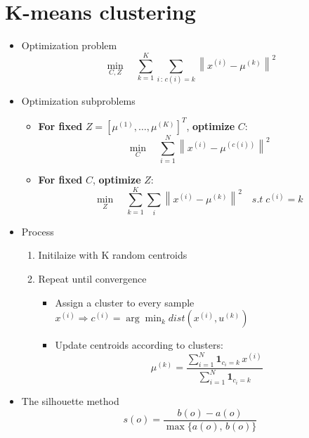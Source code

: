 \documentclass[11pt]{article}
\begin{document}
\section{K-means clustering}
\begin{itemize}
	\item Optimization problem
	      \[
		      \min_{C, Z} \quad \sum_{k=1}^{K} \sum_{i \,:\, c(i)=k} \left\| x^{(i)} - \mu^{(k)} \right\|^2
	      \]
	\item Optimization subproblems
	      \begin{itemize}
		      \item \textbf{For fixed } $Z = [\mu^{(1)}, \dots, \mu^{(K)}]^T$, \textbf{optimize } $C$:
		            \[
			            \min_{C} \quad \sum_{i=1}^{N} \left\| x^{(i)} - \mu^{(c(i))} \right\|^2
		            \]

		      \item \textbf{For fixed } $C$, \textbf{optimize } $Z$:
		            \[
			            \min_{Z} \quad \sum_{k=1}^{K} \sum_{i} \left\| x^{(i)} - \mu^{(k)} \right\|^2\quad s.t \; c^{(i)} = k
		            \]

	      \end{itemize}

	\item Process
	      \begin{enumerate}
		      \item Initilaize with K random centroids
		      \item Repeat until convergence
		            \begin{itemize}
			            \item Assign a cluster to every sample $x^{(i)} \Rightarrow c^{(i)} = \arg\min_k dist(x^{(i)}, u^{(k)})$
			            \item Update centroids according to clusters: \[
				                  \mu^{(k)} =
				                  \frac{\displaystyle \sum_{i=1}^{N} \mathbf{1}_{c_i = k} \, x^{(i)}}
				                  {\displaystyle \sum_{i=1}^{N} \mathbf{1}_{c_i = k}}
			                  \]

		            \end{itemize}
	      \end{enumerate}
	\item The silhouette  method
	      \[
		      s(o) = \frac{b(o) - a(o)}{\max\{a(o),\, b(o)\}}
	      \]

\end{itemize}
\end{document}
